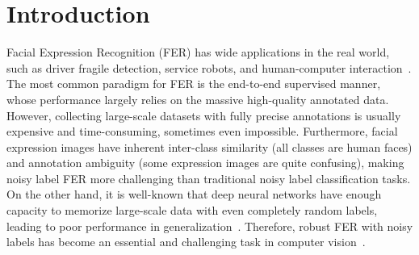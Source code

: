 \documentclass[runningheads]{llncs}
\begin{document}
\section{Introduction}

Facial Expression Recognition (FER) has wide applications in the real world, such as driver fragile detection, service robots, and human-computer interaction~\cite{she2021dive}. The most common paradigm for FER is the end-to-end supervised manner, whose performance largely relies on the massive high-quality annotated data. However, collecting large-scale datasets with fully precise annotations is usually expensive and time-consuming, sometimes even impossible. Furthermore, facial expression images have inherent inter-class similarity (all classes are human faces) and annotation ambiguity (some expression images are quite confusing), making noisy label FER more challenging than traditional noisy label classification tasks. On the other hand, it is well-known that deep neural networks have enough capacity to memorize large-scale data with even completely random labels, leading to poor performance in generalization~\cite{zhang2021understanding, arpit2017closer, jiang2018mentornet}. Therefore, robust FER with noisy labels has become an essential and challenging task in computer vision~\cite{zeng2018facial, wang2020suppressing, chen2020label, zhang2021weakly, zhang2021relative, she2021dive, gera2021noisy, fan2020learning, jiang2021boosting}. 
\end{document}
